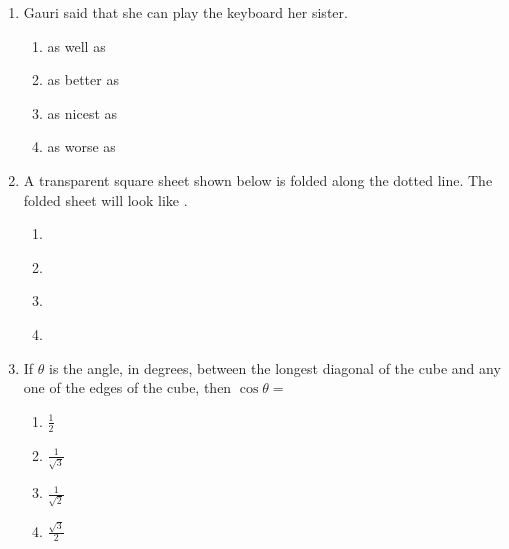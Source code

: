 \documentclass[journal,12pt,onecolumn]{IEEEtran}
\theoremstyle{remark}
\begin{document}
\renewcommand{\thetable}{\theenumi}
\begin{enumerate}
    \item Gauri said that she can play the keyboard {\underline{\hspace{2cm}}} her sister.
    \begin{enumerate}
        \item as well as
        \item as better as
        \item as nicest as
        \item as worse as
    \end{enumerate}
    \item A transparent square sheet shown below is folded along the dotted line. The folded sheet will look like {\underline{\hspace{2cm}}}.
     \begin{figure}[H]
        \centering
          
    \end{figure}
    \begin{enumerate}
        \item  \begin{figure}[H]
          
    \end{figure}
        \item  \begin{figure}[H]
         
    \end{figure}
        \item  \begin{figure}[H]
          
    \end{figure}
        \item  \begin{figure}[H]
          
    \end{figure}
    \end{enumerate}    
    \item If $\theta$ is the angle, in degrees, between the longest diagonal of the cube and any one of the edges of the cube, then $\cos \theta =$
    \begin{enumerate}
        \item $\frac{1}{2}$
        \item $\frac{1}{\sqrt{3}}$
        \item $\frac{1}{\sqrt{2}}$
        \item $\frac{\sqrt{3}}{2}$
    \end{enumerate}

\end{enumerate}
\end{document}
